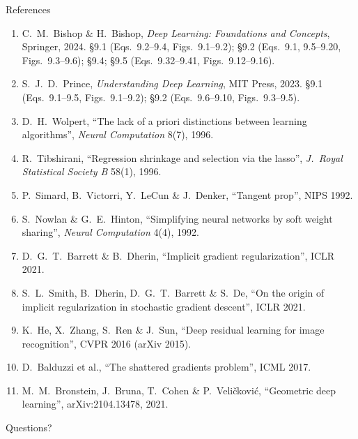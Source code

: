 \documentclass[aspectratio=169, 11pt]{beamer}
\begin{document}
\begin{frame}[allowframebreaks]{References}
  \vspace{0.3em}
  {\scriptsize
  \begin{enumerate}\itemsep0.30em
    \item C.\ M.\ Bishop \& H.\ Bishop, \emph{Deep Learning: Foundations
          and Concepts}, Springer, 2024. \S9.1 (Eqs.~9.2--9.4,
          Figs.~9.1--9.2); \S9.2 (Eqs.~9.1, 9.5--9.20,
          Figs.~9.3--9.6); \S9.4; \S9.5 (Eqs.~9.32--9.41,
          Figs.~9.12--9.16).
    \item S.\ J.\ D.\ Prince, \emph{Understanding Deep Learning}, MIT
          Press, 2023. \S9.1 (Eqs.~9.1--9.5, Figs.~9.1--9.2);
          \S9.2 (Eqs.~9.6--9.10, Figs.~9.3--9.5).
    \item D.\ H.\ Wolpert, ``The lack of a priori distinctions between
          learning algorithms'', \emph{Neural Computation} 8(7), 1996.
    \item R.\ Tibshirani, ``Regression shrinkage and selection via the
          lasso'', \emph{J.\ Royal Statistical Society B} 58(1), 1996.
    \item P.\ Simard, B.\ Victorri, Y.\ LeCun \& J.\ Denker,
          ``Tangent prop'', NIPS 1992.
    \item S.\ Nowlan \& G.\ E.\ Hinton, ``Simplifying neural networks by
          soft weight sharing'', \emph{Neural Computation} 4(4), 1992.
    \item D.\ G.\ T.\ Barrett \& B.\ Dherin, ``Implicit gradient
          regularization'', ICLR 2021.
    \item S.\ L.\ Smith, B.\ Dherin, D.\ G.\ T.\ Barrett \& S.\ De,
          ``On the origin of implicit regularization in stochastic
          gradient descent'', ICLR 2021.
    \item K.\ He, X.\ Zhang, S.\ Ren \& J.\ Sun, ``Deep residual
          learning for image recognition'', CVPR 2016 (arXiv 2015).
    \item D.\ Balduzzi et al., ``The shattered gradients problem'',
          ICML 2017.
    \item M.\ M.\ Bronstein, J.\ Bruna, T.\ Cohen \& P.\ Veli\v{c}kovi\'c,
          ``Geometric deep learning'', arXiv:2104.13478, 2021.
  \end{enumerate}}
\end{frame}

\begin{frame}[standout]
  Questions?
\end{frame}
\end{document}
